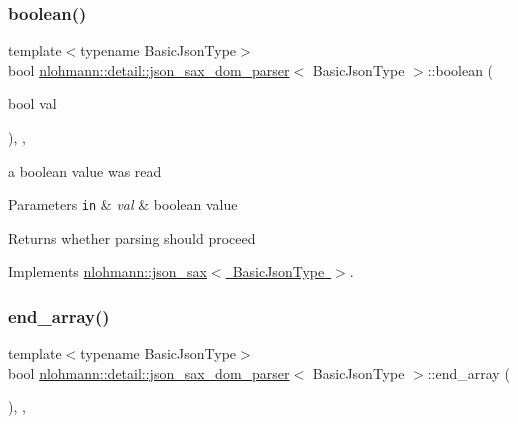 \subsubsection{\texorpdfstring{boolean()}{boolean()}}
{\footnotesize\ttfamily template$<$typename Basic\+Json\+Type$>$ \\
bool \mbox{\hyperlink{classnlohmann_1_1detail_1_1json__sax__dom__parser}{nlohmann\+::detail\+::json\+\_\+sax\+\_\+dom\+\_\+parser}}$<$ Basic\+Json\+Type $>$\+::boolean (\begin{DoxyParamCaption}\item[{bool}]{val }\end{DoxyParamCaption})\hspace{0.3cm}{\ttfamily [inline]}, {\ttfamily [override]}, {\ttfamily [virtual]}}



a boolean value was read 


\begin{DoxyParams}[1]{Parameters}
\mbox{\tt in}  & {\em val} & boolean value \\
\hline
\end{DoxyParams}
\begin{DoxyReturn}{Returns}
whether parsing should proceed 
\end{DoxyReturn}


Implements \mbox{\hyperlink{structnlohmann_1_1json__sax_a82ed080814fa656191a537284bb0c575}{nlohmann\+::json\+\_\+sax$<$ Basic\+Json\+Type $>$}}.

\mbox{\label{classnlohmann_1_1detail_1_1json__sax__dom__parser_aa6abf5a95889056d92d6af63a831b854}} 
\subsubsection{\texorpdfstring{end\+\_\+array()}{end\_array()}}
{\footnotesize\ttfamily template$<$typename Basic\+Json\+Type$>$ \\
bool \mbox{\hyperlink{classnlohmann_1_1detail_1_1json__sax__dom__parser}{nlohmann\+::detail\+::json\+\_\+sax\+\_\+dom\+\_\+parser}}$<$ Basic\+Json\+Type $>$\+::end\+\_\+array (\begin{DoxyParamCaption}{ }\end{DoxyParamCaption})\hspace{0.3cm}{\ttfamily [inline]}, {\ttfamily [override]}, {\ttfamily [virtual]}}



